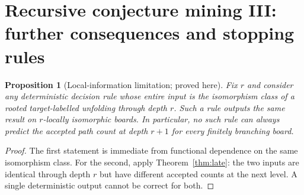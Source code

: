 \documentclass[11pt,letterpaper]{article}
\newtheorem{proposition}[theorem]{Proposition}
\theoremstyle{definition}
\begin{document}
\section{Recursive conjecture mining III: further consequences and stopping rules}
\begin{proposition}[Local-information limitation; proved here]\label{prop:localinfo}
Fix $r$ and consider any deterministic decision rule whose entire input is the isomorphism class of a rooted target-labelled unfolding through depth $r$. Such a rule outputs the same result on $r$-locally isomorphic boards. In particular, no such rule can always predict the accepted path count at depth $r+1$ for every finitely branching board.
\end{proposition}
\begin{proof}
The first statement is immediate from functional dependence on the same isomorphism class. For the second, apply Theorem~\ref{thm:late}: the two inputs are identical through depth $r$ but have different accepted counts at the next level. A single deterministic output cannot be correct for both.
\end{proof}
\end{document}
